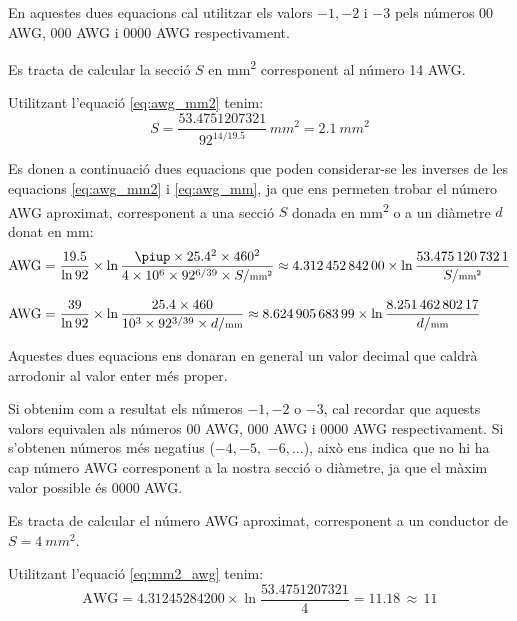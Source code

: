 En aquestes dues equacions cal utilitzar els valors $-1, -2$ i $-3$  pels números 00 AWG,
000 AWG i 0000 AWG respectivament.


\begin{exemple}\label{ex:AWGammSQ}
	\addcontentsxms{\AWGammSQ}
    Es tracta de calcular la secció $S$ en \unit{mm^2} corresponent al número 14 AWG.

    Utilitzant l'equació \eqref{eq:awg_mm2} tenim:
    \[
        S = \dfrac{\num{53,4751207321}}{92^{14/\num{19,5}}} 
        \,\unit{mm^2} = \qty{2,1}{mm^2}
    \]
\end{exemple}


Es donen a continuació dues equacions que poden considerar-se les inverses de les equacions \eqref{eq:awg_mm2} i \eqref{eq:awg_mm}, ja que ens permeten trobar el número AWG aproximat, corresponent a una secció $S$ donada en \unit{mm^2} o a un diàmetre $d$ donat en \unit{mm}:
\begin{align}
   \text{AWG} &= \frac{\num{19,5}}{\ln 92} \times \ln \frac{\piup \times
   \num{25,4}^2 \times 460^2}{4 \times 10^6 \times 92^{6/39} \times S/{\scriptstyle\unit{mm^2}}} \approx
   \num{4,31245284200} \times \ln \frac{\num{53,4751207321}}{S/{\scriptstyle\unit{mm^2}}}\label{eq:mm2_awg} \\[2ex]
   \text{AWG} &= \frac{39}{\ln 92} \times \ln \frac{\num{25,4} \times 460}{10^3 \times 92^{3/39} \times d/{\scriptstyle\unit{mm}}} \approx
   \num{8,62490568399} \times \ln \frac{\num{8,25146280217}}{d/{\scriptstyle\unit{mm}}}\label{eq:mm_awg}
\end{align}

Aquestes dues equacions ens donaran en general un valor decimal que caldrà arrodonir al valor enter  més proper.

Si obtenim com a resultat els números $-1, -2$ o $-3$, cal recordar que aquests valors equivalen als números 00 AWG,
000 AWG i 0000 AWG respectivament. Si s'obtenen números més negatius ($-4, -5,$ $-6, ...$), això ens indica que no hi ha cap número AWG corresponent a la nostra secció o diàmetre, ja que el màxim valor possible és 0000 AWG.



\begin{exemple}\label{ex:mmSQaAWG}
	\addcontentsxms{\mmSQaAWG}
    Es tracta de calcular el número AWG aproximat, corresponent a un conductor de $S=\qty{4}{mm^2}$.

    Utilitzant l'equació \eqref{eq:mm2_awg} tenim:
    \[
        \text{AWG} = \num{4,31245284200} \times \ln \dfrac{\num{53,4751207321}}{4} =
        \num{11,18} \, \approx \, 11
    \]
\end{exemple}

